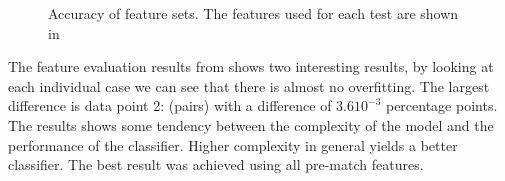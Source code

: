 \begin{figure}[!htb]
  \centering
   \caption{Accuracy of feature sets. The features used for each test are shown in }\label{fig:cluster-feat}
\end{figure}

The feature evaluation results from  shows two interesting results, by looking at each individual case we can see that there is almost no overfitting. The largest difference is data point 2: (pairs) with a difference of $3.610^{-3}$ percentage points. The results shows some tendency between the complexity of the model and the performance of the classifier. Higher complexity in general yields a better classifier. The best result was achieved using all pre-match features.

